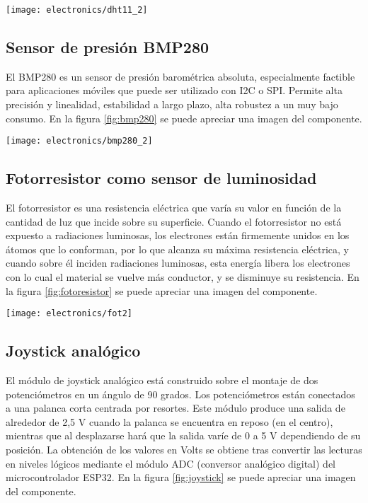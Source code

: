 \begin{center}
   \texttt{[image: electronics/dht11\_2]}
   \label{fig:dht11}
\end{center}

\subsection{Sensor de presión BMP280}

El BMP280 \cite{BMP280_datasheet} es un sensor de presión barométrica absoluta, especialmente factible para aplicaciones móviles que puede ser utilizado con I2C o SPI. Permite alta precisión y linealidad, estabilidad a largo plazo, alta robustez a un muy bajo consumo. En la figura \ref{fig:bmp280} se puede apreciar una imagen del componente.

\begin{center}
   \texttt{[image: electronics/bmp280\_2]}
   \label{fig:bmp280}
\end{center}

\subsection{Fotorresistor como sensor de luminosidad}

El fotorresistor es una resistencia eléctrica que varía su valor en función de la cantidad de luz que incide sobre su superficie.
Cuando el fotorresistor no está expuesto a radiaciones luminosas, los electrones están firmemente unidos en los átomos que lo conforman, por lo que alcanza su máxima resistencia eléctrica, y cuando sobre él inciden radiaciones luminosas, esta energía libera los electrones con lo cual el material se vuelve más conductor, y se disminuye su resistencia. En la figura \ref{fig:fotoresistor} se puede apreciar una imagen del componente.

\begin{center}
   \texttt{[image: electronics/fot2]}
   \label{fig:fotoresistor}
\end{center}


\subsection{Joystick analógico}
El módulo de joystick analógico \cite{analog_joystick_datasheet} está construido sobre el montaje de dos potenciómetros en un ángulo de 90 grados. Los potenciómetros están conectados a una palanca corta centrada por resortes.
Este módulo produce una salida de alrededor de 2,5 V cuando la palanca se encuentra en reposo (en el centro), mientras que al desplazarse hará que la salida varíe de 0 a 5 V dependiendo de su posición. La obtención de los valores en Volts se obtiene tras convertir las lecturas en niveles lógicos mediante el módulo ADC (conversor analógico digital) \cite{ESP32_adc} del microcontrolador ESP32. En la figura \ref{fig:joystick} se puede apreciar una imagen del componente.

